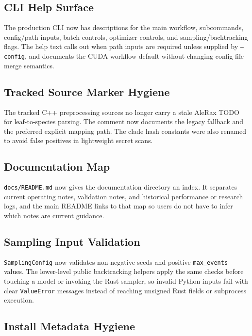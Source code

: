 \documentclass[11pt]{article}
\begin{document}
\subsection{CLI Help Surface}

The production CLI now has descriptions for the main workflow, subcommands,
config/path inputs, batch controls, optimizer controls, and sampling/backtracking
flags.  The help text calls out when path inputs are required unless supplied by
\texttt{--config}, and documents the CUDA workflow default without changing
config-file merge semantics.

\subsection{Tracked Source Marker Hygiene}

The tracked C++ preprocessing sources no longer carry a stale AleRax TODO for
leaf-to-species parsing.  The comment now documents the legacy fallback and the
preferred explicit mapping path.  The clade hash constants were also renamed to
avoid false positives in lightweight secret scans.

\subsection{Documentation Map}

\texttt{docs/README.md} now gives the documentation directory an index.  It
separates current operating notes, validation notes, and historical performance
or research logs, and the main README links to that map so users do not have to
infer which notes are current guidance.

\subsection{Sampling Input Validation}

\texttt{SamplingConfig} now validates non-negative seeds and positive
\texttt{max\_events} values.  The lower-level public backtracking helpers apply
the same checks before touching a model or invoking the Rust sampler, so invalid
Python inputs fail with clear \texttt{ValueError} messages instead of reaching
unsigned Rust fields or subprocess execution.

\subsection{Install Metadata Hygiene}
\end{document}
